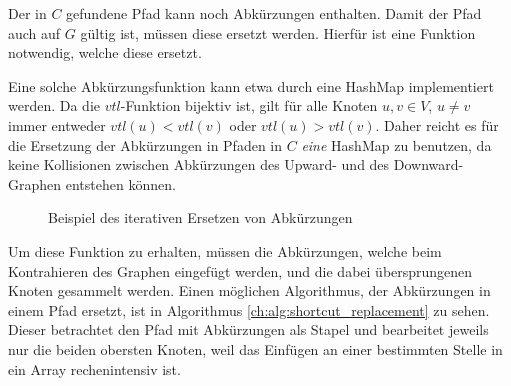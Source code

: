 Der in $C$ gefundene Pfad kann noch Abkürzungen enthalten.
Damit der Pfad auch auf $G$ gültig ist, müssen diese ersetzt werden.
Hierfür ist eine Funktion notwendig, welche diese ersetzt.

Eine solche Abkürzungsfunktion kann etwa durch eine HashMap implementiert werden.
Da die ${vtl}$-Funktion bijektiv ist, gilt für alle Knoten $u, v \in V$, $u \neq v$ immer entweder ${vtl}(u) < {vtl}(v)$ oder ${vtl}(u) > {vtl}(v)$.
Daher reicht es für die Ersetzung der Abkürzungen in Pfaden in $C$ \emph{eine} HashMap zu benutzen, da keine Kollisionen zwischen Abkürzungen des Upward- und des Downward-Graphen entstehen können.

\begin{figure}[ht]
  \centering
  \caption{Beispiel des iterativen Ersetzen von Abkürzungen}
\end{figure}

Um diese Funktion zu erhalten, müssen die Abkürzungen, welche beim Kontrahieren des Graphen eingefügt werden, und die dabei übersprungenen Knoten gesammelt werden.
Einen möglichen Algorithmus, der Abkürzungen in einem Pfad ersetzt, ist in Algorithmus \ref{ch:alg:shortcut_replacement} zu sehen.
Dieser betrachtet den Pfad mit Abkürzungen als Stapel und bearbeitet jeweils nur die beiden obersten Knoten, weil das Einfügen an einer bestimmten Stelle in ein Array rechenintensiv ist.

